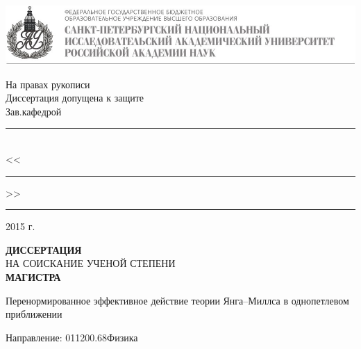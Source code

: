 
\begin{titlepage}
\begin{center}
\vspace*{-2cm}
\includegraphics[width=\textwidth]{img/logo2.jpg}

\vspace{1cm}
\begin{flushright}
	\begin{minipage}{0.45\textwidth}
		\begin{center}
На правах рукописи\\
Диссертация допущена к защите\\
Зав.кафедрой\\[2mm]
\rule{5cm}{0.5pt}\\
<<\rule{0.7cm}{0.5pt}>> \rule{2.5cm}{0.5pt}  2015 г.
		\end{center}
	\end{minipage}
\end{flushright}

\vspace{2cm}
{\bf ДИССЕРТАЦИЯ}\\
НА СОИСКАНИЕ УЧЕНОЙ СТЕПЕНИ\\
{\bf МАГИСТРА}

\vspace{1cm}
{\Large Перенормированное эффективное действие теории Янга--Миллса в однопетлевом приближении}\\
\vspace{1cm}
\begin{flushleft}
Направление: 011200.68\hspace{0.7cm}Физика

\vspace{1cm}


\end{flushleft}
\end{center}
\end{titlepage}
